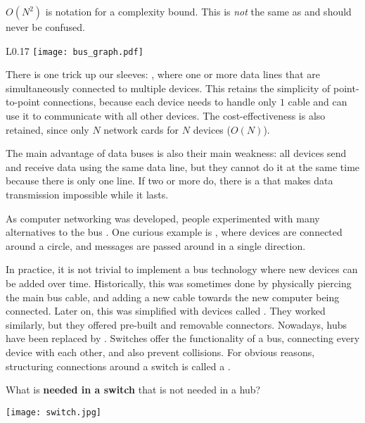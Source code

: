 \begin{remark}
$O(N^2)$ is notation for a  complexity bound. 
This is \textit{not} the same as  and should never be confused.
% 
\end{remark}

\begin{wrapfigure}{L}{0.17\linewidth}
\texttt{[image: bus\_graph.pdf]}
\end{wrapfigure}

There is one trick up our sleeves: , where one or more data lines
that are simultaneously connected to multiple devices. 
This retains the simplicity of point-to-point connections, because each device needs to handle
only $1$ cable and can use it to communicate with all other devices. The cost-effectiveness is 
also retained, since only $N$ network cards for $N$ devices ($O(N)$). 

The main advantage of data buses is also their main weakness: 
all devices send and receive data using the same data line, 
but they cannot do it at the same time because there is only one line. If two or more do, there is
a  that makes data transmission impossible while it lasts.\\[-0.5cm]

\begin{remark}
As computer networking was developed, people experimented with many alternatives to the 
bus . One curious example is , where devices
are connected around a circle, and messages are passed around in a single direction.
\end{remark}

In practice, it is not trivial to implement a bus technology 
where new devices can be added over time. 
% 
Historically, this was sometimes done by physically piercing the main bus cable,
and adding a new cable towards the new computer being connected. 
Later on, this was simplified with devices called . 
They worked similarly, but they offered pre-built  
and removable connectors.
% 
Nowadays, hubs have been replaced by . 
Switches offer the functionality of a bus, connecting every device with each other,
and also prevent collisions. For obvious reasons, structuring connections 
around a switch is called a .

\begin{exercise}
What is \textbf{needed in a switch} that is not needed in a hub?

\begin{center}
\texttt{[image: switch.jpg]}
\end{center}
\end{exercise}

